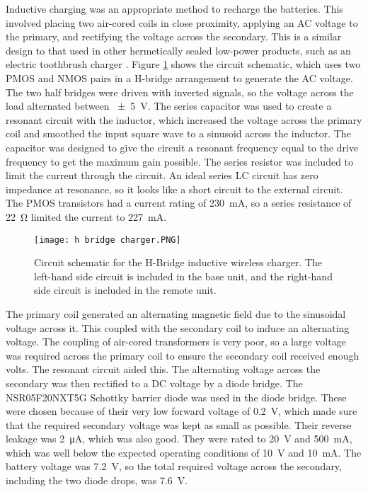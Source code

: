 Inductive charging was an appropriate method to recharge the batteries. This involved placing two air-cored coils in close proximity, applying an AC voltage to the primary, and rectifying the voltage across the secondary. This is a similar design to that used in other hermetically sealed low-power products, such as an electric toothbrush charger \cite{wireless_power_review}. Figure \ref{fig: charger schematic} shows the circuit schematic, which uses two PMOS and NMOS pairs in a H-bridge arrangement to generate the AC voltage. The two half bridges were driven with inverted signals, so the voltage across the load alternated between \SI{\pm 5}{\volt}. The series capacitor was used to create a resonant circuit with the inductor, which increased the voltage across the primary coil and smoothed the input square wave to a sinusoid across the inductor. The capacitor was designed to give the circuit a resonant frequency equal to the drive frequency to get the maximum gain possible. The series resistor was included to limit the current through the circuit. An ideal series LC circuit has zero impedance at resonance, so it looks like a short circuit to the external circuit. The PMOS transistors had a current rating of \SI{230}{\milli\ampere}, so a series resistance of \SI{22}{\ohm} limited the current to \SI{227}{\milli\ampere}.\\

\begin{figure}[ht]
	\centering
	\texttt{[image: h bridge charger.PNG]}
	\caption{Circuit schematic for the H-Bridge inductive wireless charger. The left-hand side circuit is included in the base unit, and the right-hand side circuit is included in the remote unit.}
	\label{fig: charger schematic}
\end{figure}

The primary coil generated an alternating magnetic field due to the sinusoidal voltage across it. This coupled with the secondary coil to induce an alternating voltage. The coupling of air-cored transformers is very poor, so a large voltage was required across the primary coil to ensure the secondary coil received enough volts. The resonant circuit aided this. The alternating voltage across the secondary was then rectified to a DC voltage by a diode bridge. The NSR05F20NXT5G Schottky barrier diode \cite{original_diode} was used in the diode bridge. These were chosen because of their very low forward voltage of \SI{0.2}{\volt}, which made sure that the required secondary voltage was kept as small as possible. Their reverse leakage was \SI{2}{\micro\ampere}, which was also good. They were rated to \SI{20}{\volt} and \SI{500}{\milli\ampere}, which was well below the expected operating conditions of \SI{10}{\volt} and \SI{10}{\milli\ampere}. The battery voltage was \SI{7.2}{\volt}, so the total required voltage across the secondary, including the two diode drops, was \SI{7.6}{\volt}.\\

